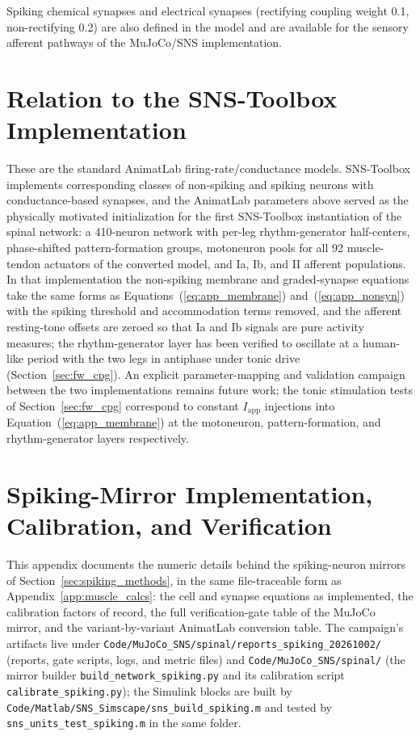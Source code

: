 Spiking chemical synapses and electrical synapses (rectifying coupling weight 0.1, non-rectifying 0.2) are also defined in the model and are available for the sensory afferent pathways of the MuJoCo/SNS implementation.

\section{Relation to the SNS-Toolbox Implementation}

These are the standard AnimatLab firing-rate/conductance models. SNS-Toolbox \citep{nourse_sns_2023} implements corresponding classes of non-spiking and spiking neurons with conductance-based synapses, and the AnimatLab parameters above served as the physically motivated initialization for the first SNS-Toolbox instantiation of the spinal network: a 410-neuron network with per-leg rhythm-generator half-centers, phase-shifted pattern-formation groups, motoneuron pools for all 92 muscle-tendon actuators of the converted model, and Ia, Ib, and II afferent populations. In that implementation the non-spiking membrane and graded-synapse equations take the same forms as Equations~(\ref{eq:app_membrane}) and~(\ref{eq:app_nonsyn}) with the spiking threshold and accommodation terms removed, and the afferent resting-tone offsets are zeroed so that Ia and Ib signals are pure activity measures; the rhythm-generator layer has been verified to oscillate at a human-like period with the two legs in antiphase under tonic drive (Section~\ref{sec:fw_cpg}). An explicit parameter-mapping and validation campaign between the two implementations remains future work; the tonic stimulation tests of Section~\ref{sec:fw_cpg} correspond to constant $I_{\text{app}}$ injections into Equation~(\ref{eq:app_membrane}) at the motoneuron, pattern-formation, and rhythm-generator layers respectively.

\section{Spiking-Mirror Implementation, Calibration, and Verification}\label{app:spiking_details}

This appendix documents the numeric details behind the spiking-neuron mirrors of Section~\ref{sec:spiking_methods}, in the same file-traceable form as Appendix~\ref{app:muscle_calcs}: the cell and synapse equations as implemented, the calibration factors of record, the full verification-gate table of the MuJoCo mirror, and the variant-by-variant AnimatLab conversion table. The campaign's artifacts live under \texttt{Code/MuJoCo\_SNS/spinal/reports\_spiking\_20261002/} (reports, gate scripts, logs, and metric files) and \texttt{Code/MuJoCo\_SNS/spinal/} (the mirror builder \texttt{build\_network\_spiking.py} and its calibration script \texttt{calibrate\_spiking.py}); the Simulink blocks are built by \texttt{Code/Matlab/SNS\_Simscape/sns\_build\_spiking.m} and tested by \texttt{sns\_units\_test\_spiking.m} in the same folder.

